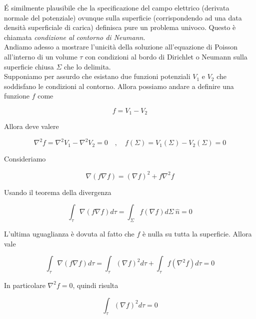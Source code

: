 \' E similmente  plausibile che la specificazione del campo elettrico (derivata normale del potenziale) ovunque sulla superficie (corrispondendo ad una data densità superficiale di carica) definisca pure un problema univoco. Questo è chiamata \emph{condizione al contorno di Neumann}. \\

Andiamo adesso a mostrare l'unicità della soluzione all'equazione di Poisson all'interno di un volume $\tau$ con condizioni al bordo di Dirichlet o Neumann sulla superficie chiusa $\Sigma$ che lo delimita. \\

Supponiamo per assurdo che esistano due funzioni potenziali $V_1$ e $V_2$ che soddisfano le condizioni al contorno. Allora possiamo andare a definire una funzione $f$ come

\begin{equation*}
    f = V_1 - V_2
\end{equation*}

Allora deve valere

\begin{equation*}
    \nabla ^2 f = \nabla^2V_1 - \nabla^2 V_2 = 0 \quad , \quad f(\Sigma) = V_1(\Sigma) - V_2(\Sigma) = 0 
\end{equation*}

Consideriamo 

\begin{equation*}
    \nabla (f \nabla f) = (\nabla f)^2 + f \nabla^2f
\end{equation*}

Usando il teorema della divergenza 

\begin{equation*}
    \int_{\tau} \nabla(f \nabla f) d\tau= \int_{\Sigma} f (\nabla f) d \Sigma \ \hat{n} = 0
\end{equation*}

L'ultima uguaglianza è dovuta al fatto che $f$ è nulla su tutta la superficie. Allora vale

\begin{equation*}
    \int_{\tau} \nabla(f \nabla f) d\tau = \int_{\tau} (\nabla f)^2 d \tau + \int_{\tau} f(\nabla^2 f) d\tau = 0
\end{equation*}

In particolare $\nabla^2 f = 0$, quindi risulta 

\begin{equation*}
    \int_{\tau} (\nabla f)^2 d \tau= 0
\end{equation*}

